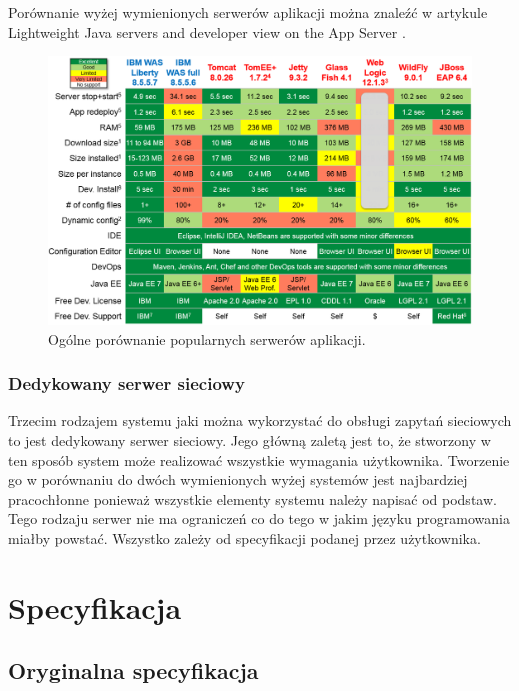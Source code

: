 \documentclass[eng]{mgr}
\begin{document}
			Porównanie wyżej wymienionych serwerów aplikacji można znaleźć w artykule Lightweight Java servers and developer view on the App Server \cite{javaserverscomparison}.
		
			\begin{center}
				\begin{figure}[H]
					\centering
					\includegraphics[scale=0.6]{weblogic-jboss-wildfly-websphere-liberty-tomee-tomcat-glassfish-comparison1.png}
					\caption{Ogólne porównanie popularnych serwerów aplikacji. \cite{javaserverscomparison}}
				\end{figure}
			\end{center}
		
			\subsection{Dedykowany serwer sieciowy}
			Trzecim rodzajem systemu jaki można wykorzystać do obsługi zapytań sieciowych to jest dedykowany serwer sieciowy. Jego główną zaletą jest to, że stworzony w ten sposób system może realizować wszystkie wymagania użytkownika. Tworzenie go w porównaniu do dwóch wymienionych wyżej systemów jest najbardziej pracochłonne ponieważ wszystkie elementy systemu należy napisać od podstaw. Tego rodzaju serwer nie ma ograniczeń co do tego w jakim języku programowania miałby powstać. Wszystko zależy od specyfikacji podanej przez użytkownika.
			
	
	\chapter{Specyfikacja}
	
		\section{Oryginalna specyfikacja}
		
\end{document}
